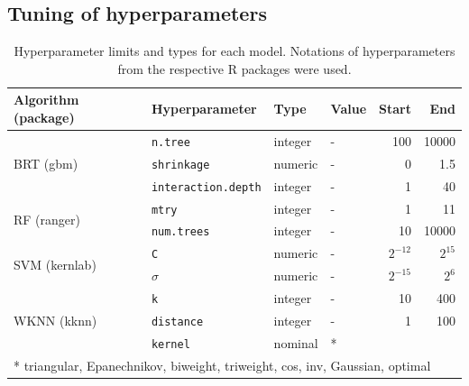 \documentclass[review]{elsarticle}
\begin{document}
\subsection{Tuning of hyperparameters}
\label{subsec:methods_tuning}

\begin{table}[b!]
\centering
\caption[t]{Hyperparameter limits and types for each model.
	Notations of hyperparameters from the respective R packages were used.}
\begingroup\footnotesize
\begin{tabular}{llllrr}
	\\
	Algorithm (package)            & Hyperparameter             & Type    & Value & Start     & End      \\
	\hline
	\multirow{3}{*}{BRT (gbm)}     & \texttt{n.tree}            & integer & -     & 100       & 10000    \\
	                               & \texttt{shrinkage}         & numeric & -     & 0         & 1.5      \\
	                               & \texttt{interaction.depth} & integer & -     & 1         & 40       \\
	\midrule
	\multirow{2}{*}{RF (ranger)}   & \texttt{mtry}              & integer & -     & 1         & 11       \\
	                               & \texttt{num.trees}         & integer & -     & 10        & 10000    \\
	\midrule
	\multirow{2}{*}{SVM (kernlab)} & \texttt{C}                 & numeric & -     & $2^{-12}$ & $2^{15}$ \\
	                               & \texttt{$\sigma$}          & numeric & -     & $2^{-15}$ & $2^{6}$  \\
	\midrule
	\multirow{3}{*}{WKNN (kknn)}   & \texttt{k}                 & integer & -     & 10        & 400      \\
	                               & \texttt{distance}          & integer & -     & 1         & 100      \\
	                               & \texttt{kernel}            & nominal & *     &           &          \\
	\bottomrule
	\multicolumn{6}{l}{* triangular, Epanechnikov, biweight, triweight, cos, inv, Gaussian, optimal}     \\
\end{tabular}
\endgroup
\label{tab:hyperparameter_limits}
\end{table}
\end{document}
